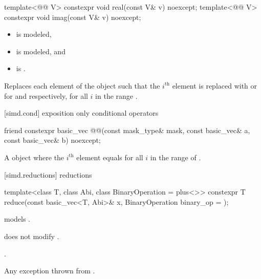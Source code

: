 \begin{itemdecl}
template<@@ V>
  constexpr void real(const V& v) noexcept;
template<@@ V>
  constexpr void imag(const V& v) noexcept;
\end{itemdecl}

\begin{itemdescr}
\pnum
\constraints
\begin{itemize}
 \item
    is modeled,
 \item
   is modeled, and
 \item
    is .
\end{itemize}

\pnum
\effects
Replaces each element of the  object such that the
$i^\text{th}$ element is replaced with  or 
for  and  respectively, for all $i$ in the range .
\end{itemdescr}

[simd.cond]{ exposition only conditional operators}

\begin{itemdecl}
friend constexpr basic_vec
@@(const mask_type& mask, const basic_vec& a, const basic_vec& b) noexcept;
\end{itemdecl}

\begin{itemdescr}
\pnum
\returns
A  object where the $i^\text{th}$ element equals
 for all $i$ in the range of
.
\end{itemdescr}

[simd.reductions]{ reductions}

\begin{itemdecl}
template<class T, class Abi, class BinaryOperation = plus<>>
  constexpr T reduce(const basic_vec<T, Abi>& x, BinaryOperation binary_op = {});
\end{itemdecl}

\begin{itemdescr}
\pnum
\constraints
{} models
.

\pnum
\expects
{} does not modify .

\pnum
\returns
{}.

\pnum
\throws
Any exception thrown from .
\end{itemdescr}

